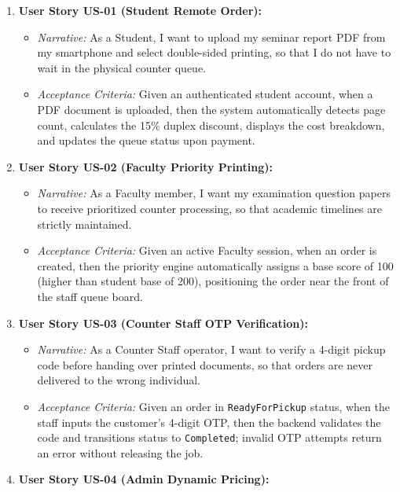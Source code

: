 \documentclass[12pt,a4paper,oneside]{report}
\begin{document}
\begin{enumerate}[leftmargin=0.35in, itemsep=4pt]
  \item \textbf{User Story US-01 (Student Remote Order):}
    \begin{itemize}[itemsep=1pt]
      \item \textit{Narrative:} As a Student, I want to upload my seminar report PDF from my smartphone and select double-sided printing, so that I do not have to wait in the physical counter queue.
      \item \textit{Acceptance Criteria:} Given an authenticated student account, when a PDF document is uploaded, then the system automatically detects page count, calculates the 15\% duplex discount, displays the cost breakdown, and updates the queue status upon payment.
    \end{itemize}
  \item \textbf{User Story US-02 (Faculty Priority Printing):}
    \begin{itemize}[itemsep=1pt]
      \item \textit{Narrative:} As a Faculty member, I want my examination question papers to receive prioritized counter processing, so that academic timelines are strictly maintained.
      \item \textit{Acceptance Criteria:} Given an active Faculty session, when an order is created, then the priority engine automatically assigns a base score of 100 (higher than student base of 200), positioning the order near the front of the staff queue board.
    \end{itemize}
  \item \textbf{User Story US-03 (Counter Staff OTP Verification):}
    \begin{itemize}[itemsep=1pt]
      \item \textit{Narrative:} As a Counter Staff operator, I want to verify a 4-digit pickup code before handing over printed documents, so that orders are never delivered to the wrong individual.
      \item \textit{Acceptance Criteria:} Given an order in \texttt{ReadyForPickup} status, when the staff inputs the customer's 4-digit OTP, then the backend validates the code and transitions status to \texttt{Completed}; invalid OTP attempts return an error without releasing the job.
    \end{itemize}
  \item \textbf{User Story US-04 (Admin Dynamic Pricing):}
    \begin{itemize}[itemsep=1pt]

\end{itemize}
\end{enumerate}
\end{document}
